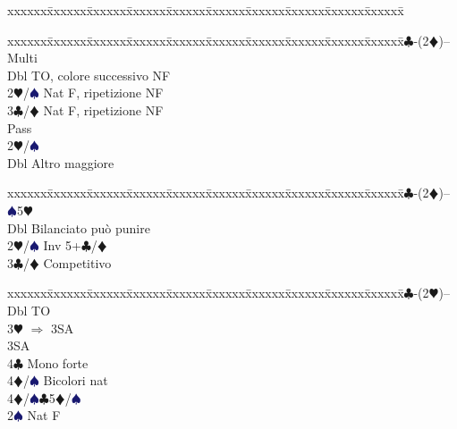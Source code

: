 \documentclass[a4paper,italian]{article}
\newcommand{\BC}{\textcolor{OliveGreen}{$\clubsuit$}}
\newcommand{\BD}{\textcolor{RedOrange}{$\vardiamondsuit$}}
\newcommand{\BH}{\textcolor{Red2}{$\varheartsuit${}}}
\newcommand{\BS}{\textcolor{MidnightBlue}{$\spadesuit${}}}
\newenvironment{bidtable}
{\begin{tabbing}

    xxxxxx\=xxxxxx\=xxxxxx\=xxxxxx\=xxxxxx\=xxxxxx\=xxxxxx\=xxxxxx\=xxxxxx\=xxxxxx\=\kill}
{\end{tabbing} }%
\begin{document}
\begin{multicols}{2}
\begin{bidtable}
                                        \end{bidtable}
                                        \vfill\null
                                        \columnbreak
                                        \begin{bidtable}
                                            1\BC-(2\BD)-- \> \> Multi\+\\
                                            Dbl \> TO, colore successivo NF\\
                                            2\BH/\BS \> Nat F, ripetizione NF\\
                                            3\BC/\BD \> Nat F, ripetizione NF\\
                                            Pass\+\\
                                            2\BH/\BS\+\\
                                            Dbl \> Altro maggiore\-\-\-
                                        \end{bidtable}
                                        \begin{bidtable}
                                            1\BC-(2\BD)-- \> \BS 5\BH \+\\
                                            Dbl \> Bilanciato può punire\\
                                            2\BH/\BS \> Inv 5+\BC /\BD \\
                                            3\BC/\BD \> Competitivo\-
                                        \end{bidtable}
                                        \begin{bidtable}
                                            1\BC-(2\BH)--\+\\
                                            Dbl \> TO\+\\
                                            3\BH\> $\Rightarrow$ 3SA\+\\
                                            3SA\+\\
                                            4\BC\> Mono forte\\
                                            4\BD/\BS\> Bicolori nat \-\-\\
                                            4\BD/\BS{}\BC5\BD/\BS\-\\
                                            2\BS \> Nat F\\

\end{bidtable}
\end{multicols}
\end{document}
